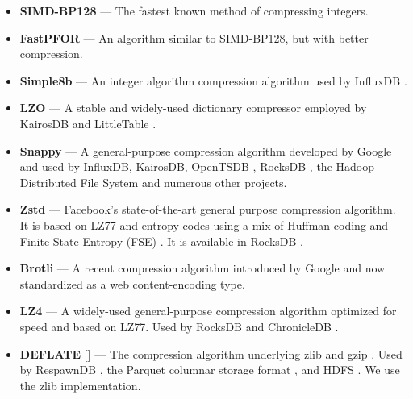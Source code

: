 \begin{itemize}[leftmargin=4mm]
\item \textbf{SIMD-BP128} \cite{fastpfor} --- The fastest known method of compressing integers.
\item \textbf{FastPFOR} \cite{fastpfor} --- An algorithm similar to SIMD-BP128, but with better compression.
\item \textbf{Simple8b} \cite{simple8b} --- An integer algorithm compression algorithm used by InfluxDB \cite{influxDB}.
\item \textbf{LZO} \cite{lzo} --- A stable and widely-used dictionary compressor employed by KairosDB \cite{kairosDB} and LittleTable \cite{littleTable}.
\item \textbf{Snappy} \cite{snappy} --- A general-purpose compression algorithm developed by Google and used by InfluxDB, KairosDB, OpenTSDB \cite{openTSDB}, RocksDB \cite{rocksDB}, the Hadoop Distributed File System \cite{hdfs} and numerous other projects.
\item \textbf{Zstd} \cite{zstd} --- Facebook's state-of-the-art general purpose compression algorithm. It is based on LZ77 and entropy codes using a mix of Huffman coding and Finite State Entropy (FSE) \cite{fse}. It is available in RocksDB \cite{rocksDB}.
\item \textbf{Brotli} \cite{brotli} --- A recent compression algorithm introduced by Google and now standardized as a web content-encoding type.
\item \textbf{LZ4} \cite{lz4} --- A widely-used general-purpose compression algorithm optimized for speed and based on LZ77. Used by RocksDB and ChronicleDB \cite{chronicleDB}.
\item \textbf{DEFLATE} [] --- The compression algorithm underlying zlib \cite{zlib} and gzip \cite{gzip}. Used by RespawnDB \cite{respawnDB}, the Parquet columnar storage format \cite{parquet}, and HDFS \cite{hdfs}. We use the zlib implementation.
\end{itemize}


